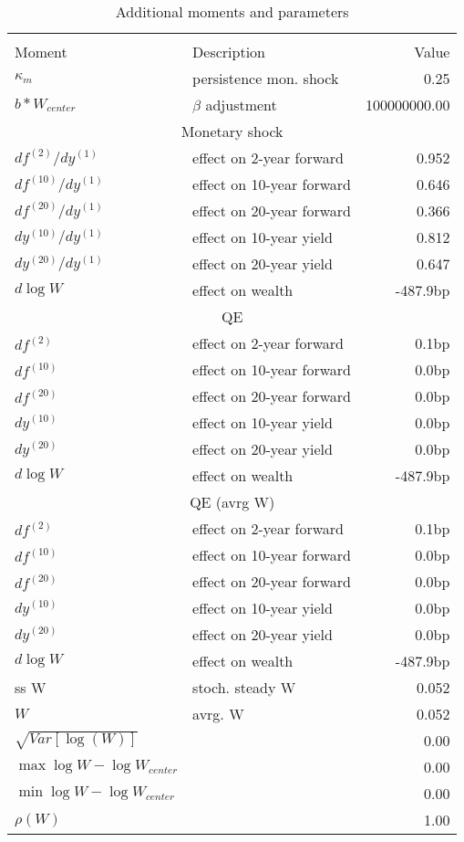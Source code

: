 \begin{table}[htbp]\centering  
 \bgroup  
 \def\arraystretch{1.25}\caption{Additional moments and parameters} 
\begin{tabular}{llr} 
\hline\hline 
\multicolumn{3}{c}{} \\ 
Moment & Description & Value  \\ 
$\kappa_m$ & persistence mon. shock  & 0.25   \\ 
$b*W_{center}$ & $\beta$ adjustment  & 100000000.00   \\ 
\hline 
\multicolumn{3}{c}{Monetary shock} \\ 
$df^{(2)}/dy^{(1)} $ & effect on 2-year forward  & 0.952 \\ 
$df^{(10)}/dy^{(1)} $ & effect on 10-year forward  & 0.646 \\ 
$df^{(20)}/dy^{(1)} $ & effect on 20-year forward  & 0.366 \\ 
$dy^{(10)}/dy^{(1)} $ & effect on 10-year yield  & 0.812 \\ 
$dy^{(20)}/dy^{(1)} $ & effect on 20-year yield  & 0.647 \\ 
$d\log W$ & effect on wealth  & -487.9bp \\ 
\hline 
\multicolumn{3}{c}{QE} \\ 
$df^{(2)}$ & effect on 2-year forward  & 0.1bp \\ 
$df^{(10)}$ & effect on 10-year forward  & 0.0bp \\ 
$df^{(20)}$ & effect on 20-year forward  & 0.0bp \\ 
$dy^{(10)}$ & effect on 10-year yield  & 0.0bp \\ 
$dy^{(20)}$ & effect on 20-year yield  & 0.0bp \\ 
$d\log W$ & effect on wealth  & -487.9bp \\ 
\hline 
\multicolumn{3}{c}{QE (avrg W)} \\ 
$df^{(2)} $ & effect on 2-year forward  & 0.1bp \\ 
$df^{(10)} $ & effect on 10-year forward  & 0.0bp \\ 
$df^{(20)} $ & effect on 20-year forward  & 0.0bp \\ 
$dy^{(10)} $ & effect on 10-year yield  & 0.0bp \\ 
$dy^{(20)} $ & effect on 20-year yield  & 0.0bp \\ 
$d\log W$ & effect on wealth  & -487.9bp \\ 
\hline 
ss W & stoch. steady W & 0.052   \\ 
$W$ & avrg. W & 0.052   \\ 
$\sqrt{Var[\log(W)]}$ &  & 0.00   \\ 
$\max \log W - \log W_{center} $ &  & 0.00   \\ 
$\min \log W - \log W_{center} $ &  & 0.00   \\ 
$\rho(W)$ &  & 1.00   \\ 
\hline 
\hline\hline 
\end{tabular} 
 \egroup 
\end{table} 
